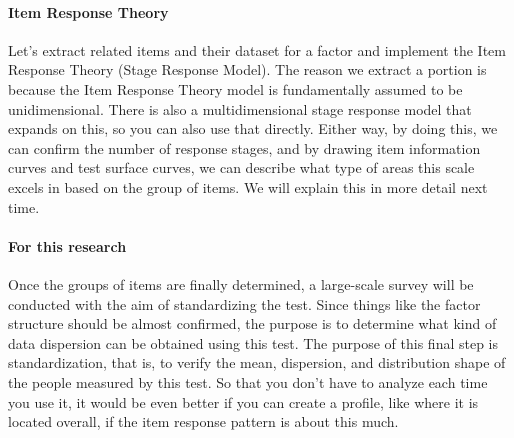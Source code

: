 \documentclass{ltjsbook}
\begin{document}
\paragraph{Item Response Theory} Let's extract related items and their dataset for a factor and implement the Item Response Theory (Stage Response Model). The reason we extract a portion is because the Item Response Theory model is fundamentally assumed to be unidimensional. There is also a multidimensional stage response model that expands on this, so you can also use that directly. Either way, by doing this, we can confirm the number of response stages, and by drawing item information curves and test surface curves, we can describe what type of areas this scale excels in based on the group of items. We will explain this in more detail next time.

\paragraph{For this research} Once the groups of items are finally determined, a large-scale survey will be conducted with the aim of standardizing the test. Since things like the factor structure should be almost confirmed, the purpose is to determine what kind of data dispersion can be obtained using this test. The purpose of this final step is standardization, that is, to verify the mean, dispersion, and distribution shape of the people measured by this test. So that you don't have to analyze each time you use it, it would be even better if you can create a profile, like where it is located overall, if the item response pattern is about this much.
\end{document}
